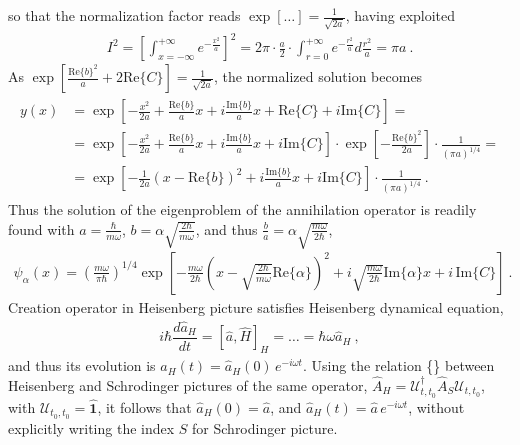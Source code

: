 \documentclass[letterpaper,10pt,english]{jupyterBook}
\begin{document}
so that the normalization factor reads \(\exp[ \dots ] = \frac{1}{\sqrt{2 a}}\), having exploited
\begin{equation*}
\begin{split}I^2 = \left[ \int_{x=-\infty}^{+\infty} e^{-\frac{x^2}{a}} \right]^2 = 2 \pi \cdot \frac{a}{2} \cdot \int_{r = 0}^{+\infty} e^{-\frac{r^2}{a}} d \frac{r^2}{a} = \pi a \ .\end{split}
\end{equation*}
\sphinxAtStartPar
As \(\exp\left[ \frac{\text{Re}\{ b \}^2}{a} + 2 \text{Re}\{ C \} \right] = \frac{1}{\sqrt{2 a}}\), the normalized solution becomes
\begin{equation*}
\begin{split}\begin{aligned}
  y(x) 
  & = \exp\left[ - \frac{x^2}{2 a} + \frac{\text{Re}\{b\}}{a} x + i \frac{\text{Im}\{b\}}{a} x + \text{Re}\{ C \} + i \text{Im}\{ C \} \right] = \\
  & = \exp\left[ - \frac{x^2}{2 a} + \frac{\text{Re}\{b\}}{a} x + i \frac{\text{Im}\{b\}}{a} x + i \text{Im}\{ C \} \right] \cdot \exp \left[ - \frac{\text{Re}\{ b \}^2}{2 a} \right] \cdot \frac{1}{(\pi a)^{1/4}} = \\
  & = \exp\left[ - \frac{1}{2 a} \left( x - \text{Re}\{ b \} \right)^2 + i \frac{\text{Im}\{b\}}{a} x + i \text{Im}\{ C \} \right] \cdot \frac{1}{(\pi a)^{1/4}} \ .
\end{aligned}\end{split}
\end{equation*}
\sphinxAtStartPar
Thus the solution of the eigenproblem of the annihilation operator is readily found with \(a = \frac{\hbar}{m \omega}\), \(b = \alpha \sqrt{\frac{2 \hbar}{m \omega}}\), and thus \(\frac{b}{a} = \alpha \sqrt{\frac{m \omega}{2 \hbar}}\),
\begin{equation*}
\begin{split}\psi_\alpha(x) = \left( \frac{m \omega}{\pi \hbar} \right)^{1/4} \exp \left[ -\frac{m \omega}{2 \hbar} \left( x - \sqrt{\frac{2 \hbar}{m \omega}} \text{Re}\{ \alpha \} \right)^2 + i \sqrt{\frac{m \omega}{2 \hbar}} \text{Im}\{ \alpha \} x + i \, \text{Im}\{ C \} \right] \ .\end{split}
\end{equation*}
\sphinxAtStartPar
{} Creation operator in Heisenberg picture satisfies Heisenberg dynamical equation,
\begin{equation*}
\begin{split}i \hbar \dfrac{d \hat{a}_H}{dt} = [\hat{a}, \hat{H}]_H = \dots = \hbar \omega \hat{a}_H \ ,\end{split}
\end{equation*}
\sphinxAtStartPar
and thus its evolution is \(\hat{a}_H(t) = \hat{a}_H(0) \, e^{-i \omega t}\). Using the relation \{\} between Heisenberg and Schrodinger pictures of the same operator, \(\hat{A}_H = \mathscr{U}_{t,t_0}^\dagger \hat{A}_S \mathscr{U}_{t,t_0}\), with \(\mathscr{U}_{t_0,t_0} = \hat{\mathbf{1}}\), it follows that \(\hat{a}_H(0) = \hat{a}\), and \(\hat{a}_H(t) = \hat{a} \, e^{-i \omega t}\), without explicitly writing the index \(S\) for Schrodinger picture.
\end{document}
